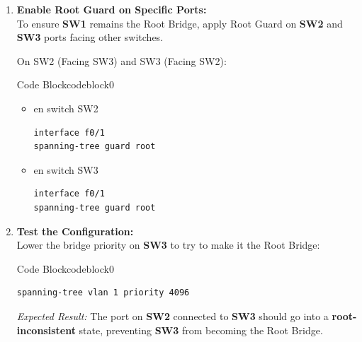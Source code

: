 \documentclass[a4paper]{book}
\begin{document}
\begin{enumerate}
	\item \textbf{Enable Root Guard on Specific Ports:} \\
	      To ensure \textbf{SW1} remains the Root Bridge, apply Root Guard on \textbf{SW2} and \textbf{SW3} ports facing other switches.

	      On SW2 (Facing SW3) and SW3 (Facing SW2):



	      \begin{ocg}{Code Block}{codeblock}{0}
		      \vspace{0.5cm}
		      \begin{itemize}
			      \item en switch SW2
			            \begin{lstlisting}
interface f0/1
spanning-tree guard root
                \end{lstlisting}
			      \item en switch SW3
			            \begin{lstlisting}
interface f0/1
spanning-tree guard root
                \end{lstlisting}
		      \end{itemize}
	      \end{ocg}

	\item \textbf{Test the Configuration:} \\
	      Lower the bridge priority on \textbf{SW3} to try to make it the Root Bridge:



	      \begin{ocg}{Code Block}{codeblock}{0}
		      \vspace{0.5cm}
		      \begin{lstlisting}
spanning-tree vlan 1 priority 4096
                \end{lstlisting}
	      \end{ocg}
	      \textit{Expected Result:} The port on \textbf{SW2} connected to \textbf{SW3} should go into a \textbf{root-inconsistent} state, preventing \textbf{SW3} from becoming the Root Bridge.


\end{enumerate}
\end{document}

